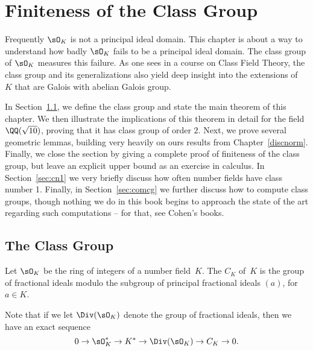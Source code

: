 
\chapter{Finiteness of the Class Group}\label{ch:classgroup}
Frequently $\sO_K$ is not a principal ideal domain.  This chapter is
about a way to understand how badly $\sO_K$ fails to be a principal
ideal domain.  The class group of $\sO_K$ measures this failure.  As
one sees in a course on Class Field Theory, the class group and its
generalizations also yield deep insight into the
extensions of~$K$ that are Galois with abelian Galois group.

In Section~\ref{sec:theclassgroup}, we define the class group and
state the main theorem of this chapter.  We then illustrate the
implications of this theorem in detail for the field $\QQ(\sqrt{10})$,
proving that it has class group of order $2$. Next, we prove several
geometric lemmas, building very heavily on ours results from
Chapter~\ref{discnorm}.  Finally, we close the section by giving a
complete proof of finiteness of the class group, but leave an explicit
upper bound as an exercise in calculus.  In Section~\ref{sec:cn1} we
very briefly discuss how often number fields have class number 1.
Finally, in Section~\ref{sec:comcg} we further discuss how to compute
class groups, though nothing we do in this book begins to approach the
state of the art regarding such computations -- for that, see Cohen's
books.

\section{The Class Group}\label{sec:theclassgroup}

\begin{definition}
	Let $\sO_K$ be the ring of integers of a number field~$K$.  The
	 $C_K$ of~$K$ is the group of fractional ideals
	modulo the subgroup of principal fractional ideals $(a)$, for $a\in K$.
\end{definition}

Note that if we let $\Div(\sO_K)$ denote the group of  fractional
ideals, then we have an exact sequence
\[
	0 \to \sO_K^* \to K^* \to \Div(\sO_K) \to C_K \to 0.
\]

